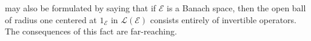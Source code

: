 may also be formulated by saying that if $\mathcal{E}$ is a Banach space, then the open ball of radius one centered at $1_{\mathcal{E}}$ in $\mathcal{L}(\mathcal{E})$ consists entirely of invertible operators. The consequences of this fact are far-reaching.
